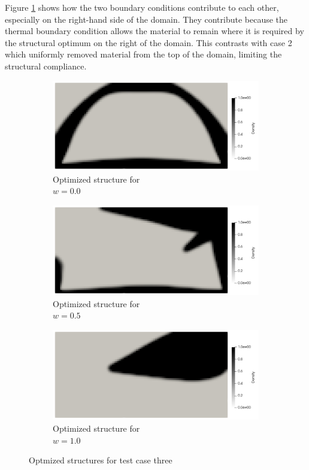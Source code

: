 Figure \ref{fig:test_case_three_structures} shows how the two boundary conditions contribute to each other, especially on the right-hand side of the domain. They contribute because the thermal boundary condition allows the material to remain where it is required by the structural optimum on the right of the domain. This contrasts with case 2 which uniformly removed material from the top of the domain, limiting the structural compliance.
\begin{figure}
    \begin{subfigure}[b]{0.3\linewidth}
        \includegraphics[width=\linewidth]{figures/chapter_6/Case3_MF_0to1.png}
        \caption{Optimized structure for \\$w=0.0$}
    \end{subfigure}
    \hfill
    \begin{subfigure}[b]{0.3\linewidth}
        \includegraphics[width=\linewidth]{figures/chapter_6/Case3_MF_1to1.png}
        \caption{Optimized structure for \\$w=0.5$}
    \end{subfigure}
    \hfill
    \begin{subfigure}[b]{0.3\linewidth}
        \includegraphics[width=\linewidth]{figures/chapter_6/Case3_MF_1to0.png}
        \caption{Optimized structure for \\$w=1.0$}
    \end{subfigure}
    \caption{Optmized structures for test case three}
    \label{fig:test_case_three_structures}
\end{figure}

